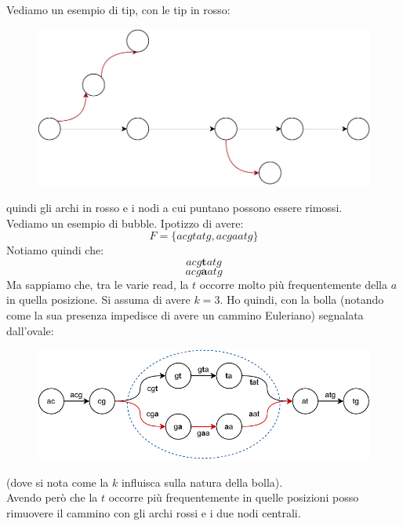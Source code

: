 \documentclass[a4paper,12pt, oneside]{book}
\begin{document}
\begin{esempio}
  Vediamo un esempio di tip, con le tip in rosso:
  \begin{figure}[H]
    \centering
    \includegraphics[scale = 0.7]{img/gra9.pdf}
  \end{figure}
  quindi gli archi in rosso e i nodi a cui puntano possono essere rimossi.\\
  Vediamo un esempio di bubble. Ipotizzo di avere:
  \[F=\{acgtatg, acgaatg\}\]
  Notiamo quindi che:
  \[acg\mathbf{t}atg\]
  \[acg\mathbf{a}atg\]
  Ma sappiamo che, tra le varie read, la $t$ occorre molto più frequentemente
  della $a$ in quella posizione.
  Si assuma di avere $k=3$. Ho quindi, con la bolla (notando come la sua
  presenza impedisce di avere un cammino Euleriano) segnalata dall'ovale:
  \begin{figure}[H]
    \centering
    \includegraphics[scale = 0.9]{img/gra10.pdf}
  \end{figure}
  (dove si nota come la $k$ influisca sulla natura della bolla).\\
  Avendo però che la $t$ occorre più frequentemente in quelle posizioni posso
  rimuovere il cammino con gli archi rossi e i due nodi centrali.
\end{esempio}
\end{document}
